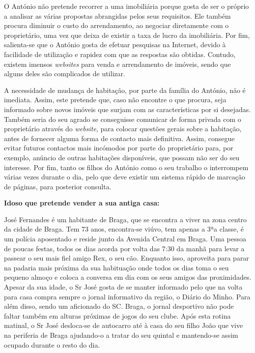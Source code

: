 O António não pretende recorrer a uma imobiliária porque gosta de ser o próprio a analisar as várias propostas abrangidas pelos seus requisitos. Ele também procura diminuir o custo do arrendamento, ao negociar diretamente com o proprietário, uma vez que deixa de existir a taxa de lucro da imobiliária. Por fim, salienta-se que o António gosta de efetuar pesquisas na Internet, devido à facilidade de utilização e rapidez com que as respostas são obtidas. Contudo, existem imensos \textit{websites} para venda e arrendamento de imóveis, sendo que alguns deles são complicados de utilizar.

A necessidade de mudança de habitação, por parte da família do António, não é imediata. Assim, este pretende que, caso não encontre o que procura, seja informado sobre novos imóveis que surjam com as características por si desejadas. Também seria do seu agrado se conseguisse comunicar de forma privada com o proprietário através do \textit{website}, para colocar questões gerais sobre a habitação, antes de fornecer alguma forma de contacto mais definitiva. Assim, consegue evitar futuros contactos mais incómodos por parte do proprietário para, por exemplo, anúncio de outras habitações disponíveis, que possam não ser do seu interesse. Por fim, tanto os filhos do António como o seu trabalho o interrompem várias vezes durante o dia, pelo que deve existir um sistema rápido de marcação de páginas, para posterior consulta.

\vspace{0.4cm}
\noindent\textbf{Idoso que pretende vender a sua antiga casa:}

José Fernandes é um habitante de Braga, que se encontra a viver na zona centro da cidade de Braga. Tem 73 anos, encontra-se viúvo, tem apenas a 3ªa classe, é um polícia aposentado e reside junto da Avenida Central em Braga. Uma pessoa de poucas festas, todos os dias acorda por volta das 7:30 da manhã para levar a passear o seu mais fiel amigo Rex, o seu cão. Enquanto isso, aproveita para parar na padaria mais próxima da sua habituação onde todos os dias toma o seu pequeno almoço e coloca a conversa em dia com os seus amigos das proximidades. Apesar da sua idade, o Sr José gosta de se manter informado pelo que na volta para casa compra sempre o jornal informativo da região, o Diário do Minho. Para além disso, sendo um aficionado do SC. Braga, o jornal desportivo não pode faltar também em alturas próximas de jogos do seu clube. Após esta rotina matinal, o Sr José desloca-se de autocarro até à casa do seu filho João que vive na periferia de Braga ajudando-o a tratar do seu quintal e mantendo-se assim ocupado durante o resto do dia.

